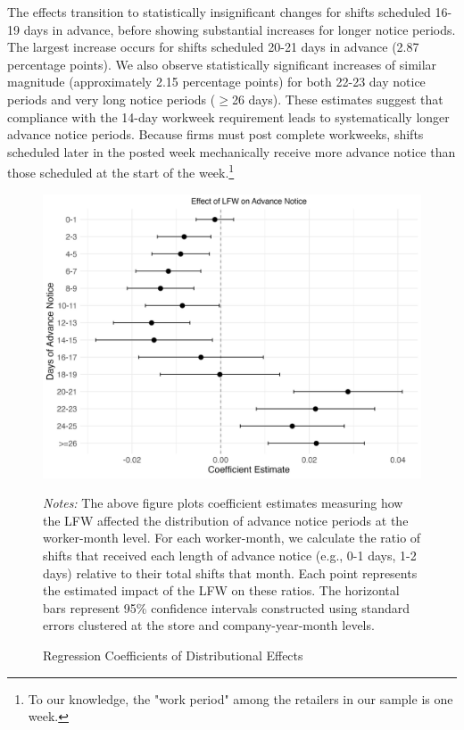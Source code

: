 \documentclass[letterpaper,11pt,leqno]{article}
\theoremstyle{paper}
\newcommand{\note}[2][]{\parbox{\textwidth}{\footnotesize\vspace*{10pt}\textit{#1}#2}}
\begin{document}
The effects transition to statistically insignificant changes for shifts scheduled 16-19 days in advance, before showing substantial increases for longer notice periods. The largest increase occurs for shifts scheduled 20-21 days in advance (2.87 percentage points). We also observe statistically significant increases of similar magnitude (approximately 2.15 percentage points) for both 22-23 day notice periods and very long notice periods ($\geq$26 days). These estimates suggest that compliance with the 14-day workweek requirement leads to systematically longer advance notice periods. Because firms must post complete workweeks, shifts scheduled later in the posted week mechanically receive more advance notice than those scheduled at the start of the week.\footnote{To our knowledge, the "work period" among the retailers in our sample is one week.}



\begin{figure}[h]
\centering
\caption{Regression Coefficients of Distributional Effects}
\includegraphics[scale=0.16]{Figures_Revision_2/advance_notice_distr_plot_new.jpeg}
\vspace{-0.50cm}
\note{\scriptsize \singlespacing \textit{Notes: } The above figure plots coefficient estimates measuring how the LFW affected the distribution of advance notice periods at the worker-month level. For each worker-month, we calculate the ratio of shifts that received each length of advance notice (e.g., 0-1 days, 1-2 days) relative to their total shifts that month. Each point represents the estimated impact of the LFW on these ratios. The horizontal bars represent 95\% confidence intervals constructed using standard errors clustered at the store and company-year-month levels. }
\label{f:adv_notice_distribution}
\end{figure}
\end{document}
